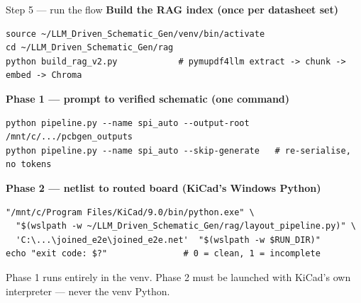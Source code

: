 \documentclass[aspectratio=169,10pt]{beamer}
\begin{document}
\begin{frame}[fragile]{Step 5 --- run the flow}
\vspace{1mm}
\textbf{Build the RAG index (once per datasheet set)}
\begin{lstlisting}
source ~/LLM_Driven_Schematic_Gen/venv/bin/activate
cd ~/LLM_Driven_Schematic_Gen/rag
python build_rag_v2.py            # pymupdf4llm extract -> chunk -> embed -> Chroma
\end{lstlisting}
\textbf{Phase 1 --- prompt to verified schematic (one command)}
\begin{lstlisting}
python pipeline.py --name spi_auto --output-root /mnt/c/.../pcbgen_outputs
python pipeline.py --name spi_auto --skip-generate   # re-serialise, no tokens
\end{lstlisting}
\textbf{Phase 2 --- netlist to routed board (KiCad's Windows Python)}
\begin{lstlisting}
"/mnt/c/Program Files/KiCad/9.0/bin/python.exe" \
  "$(wslpath -w ~/LLM_Driven_Schematic_Gen/rag/layout_pipeline.py)" \
  'C:\...\joined_e2e\joined_e2e.net'  "$(wslpath -w $RUN_DIR)"
echo "exit code: $?"               # 0 = clean, 1 = incomplete
\end{lstlisting}
\vspace{1mm}
\begin{center}\footnotesize\color{stgrey}
Phase 1 runs entirely in the venv. Phase 2 must be launched with KiCad's own interpreter --- never the venv Python.
\end{center}
\end{frame}
\end{document}

